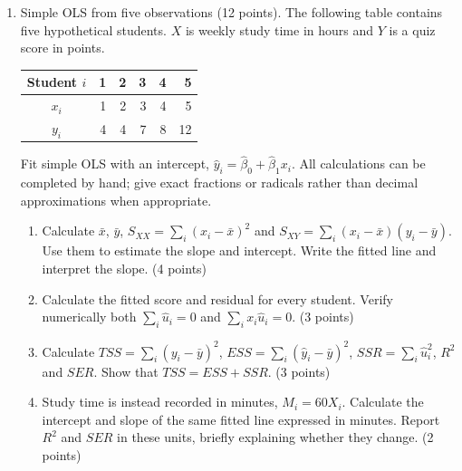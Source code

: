 \documentclass[a4paper,11pt,twoside]{article}
\begin{document}
\begin{enumerate}[label=\arabic*.,leftmargin=*,itemsep=5pt,topsep=4pt,parsep=0pt,start=9]
\Needspace{6.5cm}
\item Simple OLS from five observations (12 points).
The following table contains five hypothetical students. $X$ is weekly study
time in hours and $Y$ is a quiz score in points.
\begin{center}
\begin{tabular}{c|rrrrr}
Student $i$ & 1 & 2 & 3 & 4 & 5 \\ \hline
$x_i$ & 1 & 2 & 3 & 4 & 5 \\
$y_i$ & 4 & 4 & 7 & 8 & 12
\end{tabular}
\end{center}
Fit simple OLS with an intercept, $\widehat y_i=\widehat\beta_0+
\widehat\beta_1x_i$. All calculations can be completed by hand; give exact
fractions or radicals rather than decimal approximations when appropriate.
\begin{enumerate}[label=(\alph*),leftmargin=*,itemsep=2pt,topsep=2pt]
\item Calculate $\bar x$, $\bar y$, $S_{XX}=\sum_i(x_i-\bar x)^2$ and
$S_{XY}=\sum_i(x_i-\bar x)(y_i-\bar y)$. Use them to estimate the slope and
intercept. Write the fitted line and interpret the slope. (4 points)
\item Calculate the fitted score and residual for every student. Verify
numerically both $\sum_i\widehat u_i=0$ and
$\sum_i x_i\widehat u_i=0$. (3 points)
\item Calculate $TSS=\sum_i(y_i-\bar y)^2$,
$ESS=\sum_i(\widehat y_i-\bar y)^2$, $SSR=\sum_i\widehat u_i^2$,
$R^2$ and $SER$. Show that $TSS=ESS+SSR$. (3 points)
\item Study time is instead recorded in minutes, $M_i=60X_i$. Calculate the
intercept and slope of the same fitted line expressed in minutes. Report
$R^2$ and $SER$ in these units, briefly explaining whether they change.
(2 points)
\end{enumerate}
\end{enumerate}
\end{document}
